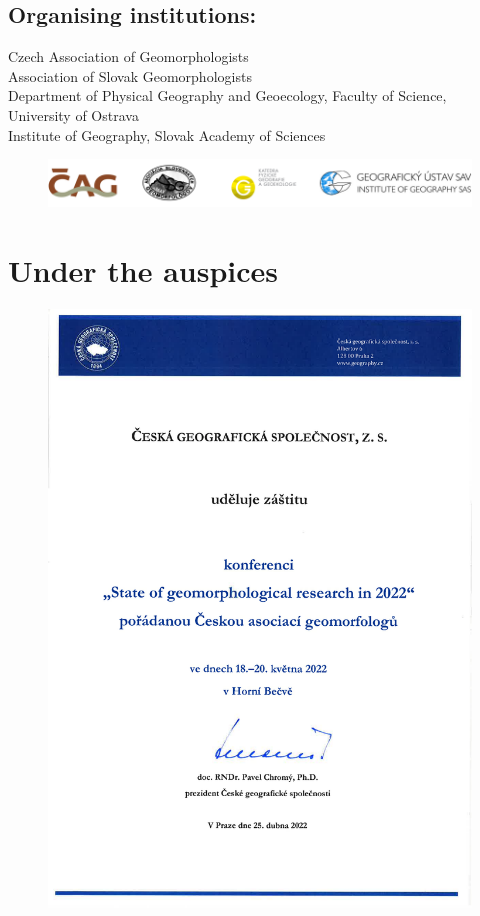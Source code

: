 \documentclass[
	openany, %
	parskip=false, %
	12pt, %
	a4paper, %
]{conferencebooklet} %
\begin{document}
\section{Organising institutions:}
\noindent
Czech Association of Geomorphologists\\
Association of Slovak Geomorphologists\\
Department of Physical Geography and Geoecology, Faculty of Science, University of Ostrava\\
Institute of Geography, Slovak Academy of Sciences
\begin{figure}[h]
	\centering
	\includegraphics[width=1\linewidth]{images/geomorfologie-logolink}
\end{figure}

\newpage
\chapter*{Under the auspices}
\begin{figure}[!htb]
	\centering
	\includegraphics[width=0.9\linewidth]{"images/logos/Partnerlogos/2022 04 25 záštita ČGS geomorfologové 1"}
\end{figure}
\end{document}
